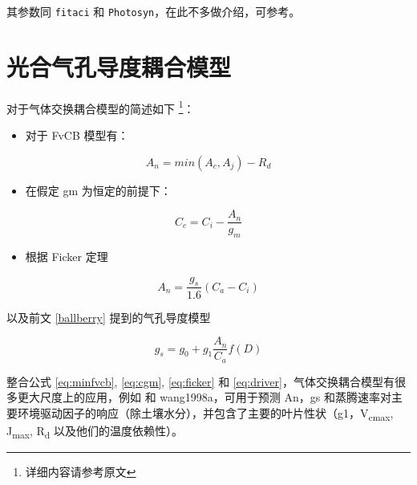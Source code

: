 \documentclass[
]{krantz}
\providecommand{\tightlist}{%
  \setlength{\itemsep}{0pt}\setlength{\parskip}{0pt}}
\begin{document}
其参数同 \texttt{fitaci} 和 \texttt{Photosyn}，在此不多做介绍，可参考\citep[\citet{Buckley2014Is}, \citet{Medlyn2011Reconciling}]{Cowan1977Stomatal}。

\cleardoublepage

\hypertarget{photo_stomo}{%
\chapter{光合气孔导度耦合模型}\label{photo_stomo}}

\citet{Duursma2015Plantecophys} 对于气体交换耦合模型的简述如下 \footnote{详细内容请参考原文}：

\begin{itemize}
\tightlist
\item
  对于 FvCB 模型有：
\end{itemize}

\begin{equation}
A_n = min(A_c, A_j)-R_d
\label{eq:minfvcb}
\end{equation}

\begin{itemize}
\tightlist
\item
  在假定 gm 为恒定的前提下：
\end{itemize}

\begin{equation}
C_c = C_i - \frac{A_n}{g_m}
\label{eq:cgm}
\end{equation}

\begin{itemize}
\tightlist
\item
  根据 Ficker 定理
\end{itemize}

\begin{equation}
A_n = \frac{g_s}{1.6}(C_a - C_i)
\label{eq:ficker}
\end{equation}

以及前文 \ref{ballberry} 提到的气孔导度模型

\begin{equation}
g_s = g_0 + g_1 \frac{A_n}{C_a} f(D)
\label{eq:driver}
\end{equation}

整合公式 \eqref{eq:minfvcb}, \eqref{eq:cgm}, \eqref{eq:ficker} 和 \eqref{eq:driver}，气体交换耦合模型有很多更大尺度上的应用，例如 \citet{Duursma2012MAESPA} 和 wang1998a，可用于预测 An，gs 和蒸腾速率对主要环境驱动因子的响应（除土壤水分），并包含了主要的叶片性状（g1，V\textsubscript{cmax}, J\textsubscript{max}, R\textsubscript{d} 以及他们的温度依赖性）。
\end{document}
